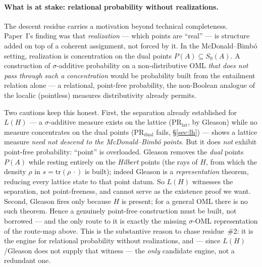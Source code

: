\documentclass[11pt]{article}
\theoremstyle{definition}
\newcommand{\tr}{\mathrm{tr}}
\begin{document}
\paragraph{What is at stake: relational probability without realizations.}
The descent residue carries a motivation beyond technical
completeness.  Paper~I's finding was that \emph{realization} ---
which points are ``real'' --- is structure added on top of a coherent
assignment, not forced by it.  In the McDonald--Bimb\'{o} setting,
realization is concentration on the dual points $P(A) \subseteq
S_0(A)$.  A construction of $\sigma$-additive probability on a
non-distributive OML \emph{that does not pass through such a
concentration} would be probability built from the entailment relation
alone --- a relational, point-free probability, the non-Boolean analogue
of the localic (pointless) measures distributivity already permits.

Two cautions keep this honest.  First, the separation already
established for $L(H)$ --- a $\sigma$-additive measure exists on the
lattice ($\text{PR}_{\text{lat}}$, by Gleason) while no measure
concentrates on the dual points ($\text{PR}_{\text{dual}}$ fails,
\S\ref{sec:lh}) --- shows a lattice measure \emph{need not descend to
the McDonald--Bimb\'{o} points}.  But it does \emph{not} exhibit
point-free probability: ``point'' is overloaded.  Gleason removes the
\emph{dual} points $P(A)$ while resting entirely on the \emph{Hilbert}
points (the rays of $H$, from which the density $\rho$ in
$s = \tr(\rho\,\cdot)$ is built); indeed Gleason is a \emph{representation}
theorem, reducing every lattice state to that point datum.  So $L(H)$
witnesses the separation, not point-freeness, and cannot serve as the
existence proof we want.  Second, Gleason fires only because $H$ is
present; for a general OML there is no such theorem.  Hence a genuinely
point-free construction must be built, not borrowed --- and the only
route to it is exactly the missing $\sigma$-OML representation of the
route-map above.  This is the substantive reason to chase residue~\#2:
it is the engine for relational probability without realizations, and ---
since $L(H)$/Gleason does not supply that witness --- the \emph{only}
candidate engine, not a redundant one.
\end{document}
